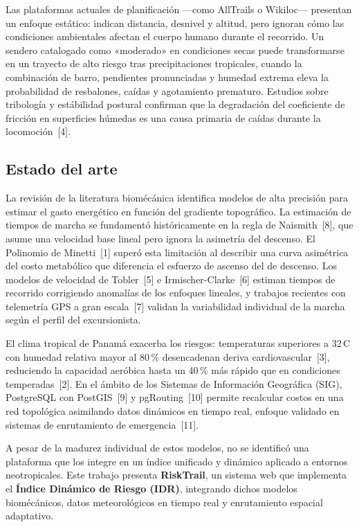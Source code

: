 \documentclass[10pt,letterpaper,twocolumn]{article}
\begin{document}
Las plataformas actuales de planificaci\'{o}n ---como AllTrails o
Wikiloc--- presentan un enfoque est\'{a}tico: indican distancia, desnivel
y altitud, pero ignoran c\'{o}mo las condiciones ambientales afectan el
cuerpo humano durante el recorrido. Un sendero catalogado como «moderado»
en condiciones secas puede transformarse en un trayecto de alto riesgo tras
precipitaciones tropicales, cuando la combinaci\'{o}n de barro, pendientes
pronunciadas y humedad extrema eleva la probabilidad de resbalones, ca\'{i}das
y agotamiento prematuro. Estudios sobre tribolog\'{i}a y est\'{a}bilidad
postural confirman que la degradaci\'{o}n del coeficiente de fricci\'{o}n
en superficies h\'{u}medas es una causa primaria de ca\'{i}das durante la
locomoci\'{o}n~[4].

\subsection{Estado del arte}

La revisi\'{o}n de la literatura biom\'{e}c\'{a}nica identifica modelos de
alta precisi\'{o}n para estimar el gasto energ\'{e}tico en funci\'{o}n del
gradiente topogr\'{a}fico. La estimaci\'{o}n de tiempos de marcha se
fundament\'{o} hist\'{o}ricamente en la regla de Naismith~[8], que asume
una velocidad base lineal pero ignora la asimetr\'{i}a del descenso. El
Polinomio de Minetti~[1] super\'{o} esta limitaci\'{o}n al describir una
curva asim\'{e}trica del costo metab\'{o}lico que diferencia el esfuerzo de
ascenso del de descenso. Los modelos de velocidad de Tobler~[5] e
Irmischer-Clarke~[6] estiman tiempos de recorrido corrigiendo anomal\'{i}as
de los enfoques lineales, y trabajos recientes con telemetr\'{i}a GPS a gran
escala~[7] validan la variabilidad individual de la marcha seg\'{u}n el
perfil del excursionista.

El clima tropical de Panam\'{a} exacerba los riesgos: temperaturas
superiores a 32\,\textdegree C con humedad relativa mayor al 80\,\%
desencadenan deriva cardiovascular~[3], reduciendo la capacidad aer\'{o}bica
hasta un 40\,\% m\'{a}s r\'{a}pido que en condiciones temperadas~[2]. En el
\'{a}mbito de los Sistemas de Informaci\'{o}n Geogr\'{a}fica (SIG),
PostgreSQL con PostGIS~[9] y pgRouting~[10] permite recalcular costos en una
red topol\'{o}gica asimilando datos din\'{a}micos en tiempo real, enfoque
validado en sistemas de enrutamiento de emergencia~[11].

A pesar de la madurez individual de estos modelos, no se identific\'{o} una
plataforma que los integre en un \'{i}ndice unificado y din\'{a}mico
aplicado a entornos neotropicales. Este trabajo presenta \textbf{RiskTrail},
un sistema web que implementa el \textbf{\'{I}ndice Din\'{a}mico de Riesgo
(IDR)}, integrando dichos modelos biom\'{e}c\'{a}nicos, datos
meteorol\'{o}gicos en tiempo real y enrutamiento espacial adaptativo.
\end{document}
